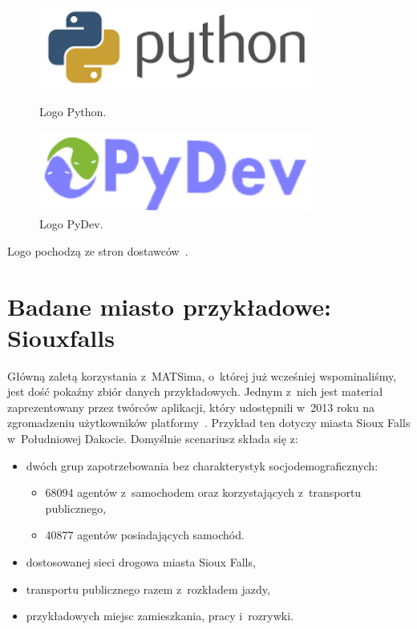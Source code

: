 \documentclass[twoside,12pt]{report}
\begin{document}
\begin{figure}[ht]
\begin{flushleft}
	\begin{minipage}[]{.47\textwidth}
	\vspace*{30px}
	\centering
	\includegraphics[width=0.8\textwidth]{img/py}
	\caption{Logo Python.}
	\end{minipage}%
\end{flushleft}
\begin{flushright}
	\begin{minipage}[]{.47\textwidth}
	\centering
	\includegraphics[width=0.8\textwidth]{img/pydev}
	\caption{Logo PyDev.}
	\end{minipage}
\end{flushright}
\end{figure}

Logo pochodzą ze stron dostawców~\cite{java, eclipse, python,pydev}.

\section{Badane miasto przykładowe: Siouxfalls}

Główną zaletą korzystania z~MATSima, o~której już wcześniej wspominaliśmy, jest dość pokaźny zbiór danych przykładowych. Jednym z~nich jest materiał zaprezentowany przez twórców aplikacji, który udostępnili w~2013 roku na zgromadzeniu użytkowników platformy~\cite{siux}. Przykład ten dotyczy miasta Sioux Falls w~Południowej Dakocie. Domyślnie scenariusz składa się z:

\begin{itemize}
\item dwóch grup zapotrzebowania bez charakterystyk socjodemograficznych:
\begin{itemize}
\item 68094 agentów z~samochodem oraz korzystających z~transportu publicznego,
\item 40877 agentów posiadających samochód.
\end{itemize}
\item dostosowanej sieci drogowa miasta Sioux Falls,
\item transportu publicznego razem z~rozkładem jazdy,
\item przykładowych miejsc zamieszkania, pracy i~rozrywki.
\end{itemize}
\end{document}
